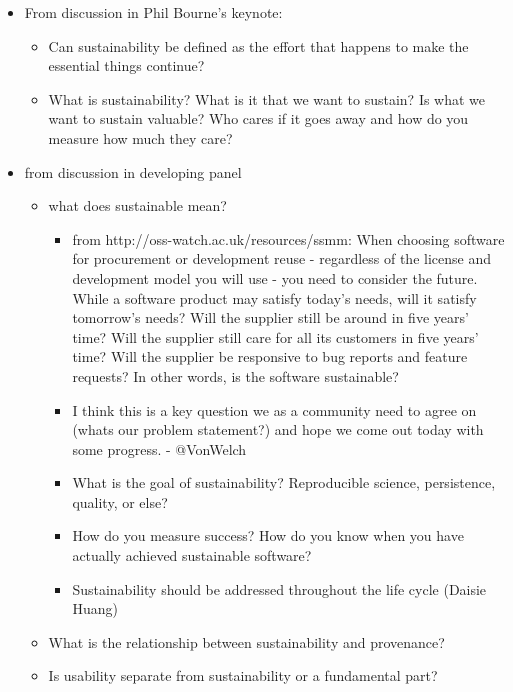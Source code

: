 \documentclass[11pt, oneside]{amsart}
\begin{document}
\begin{itemize}

\item From discussion in Phil Bourne's keynote:
\begin{itemize}
\item Can sustainability be defined as the effort that happens to make the essential things continue?
\item What is sustainability? What is it that we want to sustain? Is what we want to sustain valuable? Who cares if it goes away and how do you measure how much they care?
\end{itemize}

\item from discussion in developing panel

\begin{itemize}
\item what does sustainable mean?
\begin{itemize}
\item from http://oss-watch.ac.uk/resources/ssmm: When choosing software for procurement or development reuse - regardless of the license and development model you will use - you need to consider the future. While a software product may satisfy today's needs, will it satisfy tomorrow's needs? Will the supplier still be around in five years' time? Will the supplier still care for all its customers in five years' time? Will the supplier be responsive to bug reports and feature requests? In other words, is the software sustainable?
\item I think this is a key question we as a community need to agree on (whats our problem statement?) and hope we come out today with some progress. - @VonWelch
\item What is the goal of sustainability? Reproducible science, persistence, quality, or else?
\item How do you measure success? How do you know when you have actually achieved sustainable software?
\item Sustainability should be addressed throughout the life cycle (Daisie Huang)
\end{itemize}

\item What is the relationship between sustainability and provenance?

\item Is usability separate from sustainability or a fundamental part?
\end{itemize}


\end{itemize}
\end{document}
